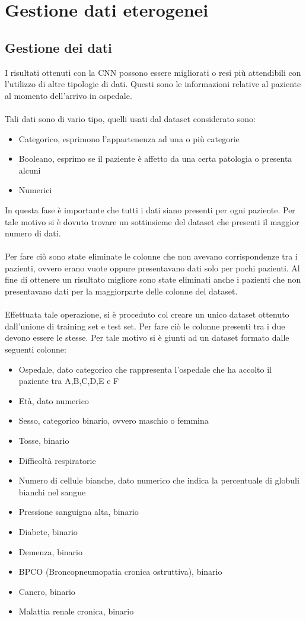\chapter{Gestione dati eterogenei}
\label{ch:MLP}
\section{Gestione dei dati}
I risultati ottenuti con la CNN possono essere migliorati o resi più attendibili con l'utilizzo
di altre tipologie di dati. Questi sono le informazioni relative al paziente al momento dell'arrivo in 
ospedale.
\\\\
Tali dati sono di vario tipo, quelli usati dal dataset considerato sono: 
\begin{itemize}
    \item Categorico, esprimono l'appartenenza ad una o più categorie
    \item Booleano, esprimo se il paziente è affetto da una certa patologia o presenta alcuni 
    \item Numerici
\end{itemize}
In questa fase è importante che tutti i dati siano presenti per ogni paziente. Per tale motivo si è dovuto 
trovare un sottinsieme del dataset che presenti il maggior numero di dati. 
\\\\
Per fare ciò sono state eliminate le colonne che non avevano corrispondenze 
tra i pazienti, ovvero erano vuote oppure presentavano dati solo per pochi pazienti.
Al fine di ottenere un risultato migliore sono state eliminati anche i pazienti che non presentavano dati per 
la maggiorparte delle colonne del dataset.
\\\\
Effettuata tale operazione, si è proceduto col creare un unico dataset ottenuto dall'unione 
di training set e test set. Per fare ciò le colonne presenti tra i due devono essere le stesse.
Per tale motivo si è giunti ad un dataset formato dalle seguenti colonne:
\begin{itemize}
    \item Ospedale, dato categorico che rappresenta l'ospedale che ha accolto il paziente tra A,B,C,D,E e F 
    \item Età, dato numerico
    \item Sesso, categorico binario, ovvero maschio o femmina
    \item Tosse, binario
    \item Difficoltà respiratorie
    \item Numero di cellule bianche, dato numerico che indica la percentuale di globuli bianchi nel sangue
    \item Pressione sanguigna alta,  binario
    \item Diabete, binario
    \item Demenza, binario 
    \item BPCO (Broncopneumopatia cronica ostruttiva), binario 
    \item Cancro, binario 
    \item Malattia renale cronica, binario
\end{itemize}

